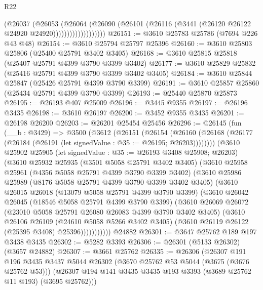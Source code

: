 \begin{lexlean}{R22}
\begin{coremodule}
                          (@26037
                            (@26053
                              (@26064
                                (@26090
                                  (@26101
                                    (@26116 (@3441 (@26120 @26122 @24920 @24920)))))))))))))))))))
@26151 := @3610 @25783 @25786 (@7694 @226 @43 @48)
@26154 := @3610 @25794 @25797 @25396
@26160 := @3610 @25803 @25806 (@25400 @25791 @3402 @3405)
@26168 := @3610 @25815 @25818 (@25407 @25791 @4399 @3790 @3399 @3402)
@26177 := @3610 @25829 @25832 (@25416 @25791 @4399 @3790 @3399 @3402 @3405)
@26184 := @3610 @25844 @25847 (@25426 @25791 @4399 @3790 @3399)
@26191 := @3610 @25857 @25860 (@25434 @25791 @4399 @3790 @3399)
@26193 := @25440 @25870 @25873
@26195 := @26193 @407 @25009
@26196 := @3445 @9355
@26197 := @26196 @3435
@26198 := @3610 @26197
@26200 := @3452 @9355 @3435
@26201 := @26198 @26200
@26203 := @26201 @25454 @25456
@26296 := @26145
    (fun (__b : @3429) =>
    @3500
      (@3612
        (@26151
          (@26154
            (@26160 (@26168 (@26177 (@26184 (@26191 (let signedValue : @35 := @26195; @26203))))))))
        (@3610
          @25902
          @25905
          (let signedValue : @35 := @26193 @3408 @25908; @26203)
          (@3610
            @25932
            @25935
            (@3501 @5058 @25791 @3402 @3405)
            (@3610
              @25958
              @25961
              (@4356 @5058 @25791 @4399 @3790 @3399 @3402)
              (@3610
                @25986
                @25989
                (@8176 @5058 @25791 @4399 @3790 @3399 @3402 @3405)
                (@3610
                  @26015
                  @26018
                  (@13079 @5058 @25791 @4399 @3790 @3399)
                  (@3610
                    @26042
                    @26045
                    (@18546 @5058 @25791 @4399 @3790 @3399)
                    (@3610
                      @26069
                      @26072
                      (@23010 @5058 @25791 @26080 @26083 @4399 @3790 @3402 @3405)
                      (@3610
                        @26106
                        @26109
                        (@24610 @5058 @5266 @3402 @3405)
                        (@3610 @26119 @26122 (@25395 @3408) @25396)))))))))))
    @24882
@26301 := @3647 @25762 @189 @197 @3438 @3435
@26302 := @5282 @3393
@26306 := @26301 (@5133 @26302) (@3657 @24882)
@26307 := @3661 @25762
@26335 := @26306
    (@26307
      @191
      @196
      @3435
      @3437
      @5044
      @26302
      (@3670 @25762 @53 @5044 (@3675 (@3676 @25762 @53)))
      (@26307 @194 @141 @3435 @3435 @193 @3393 (@3689 @25762 @11 @193) (@3695 @25762)))

\end{coremodule}
\end{lexlean}
